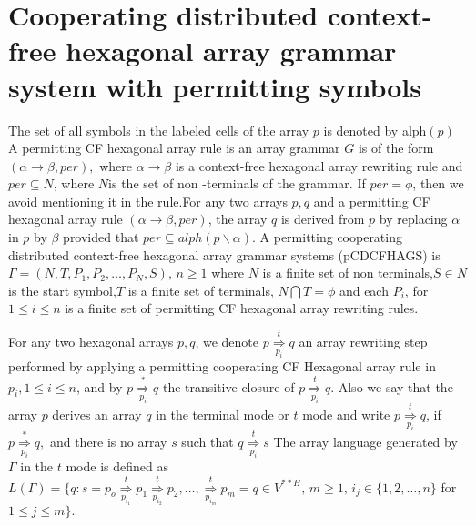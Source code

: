 \documentclass[11pt]{article}
\begin{document}
\section {Cooperating distributed context-free hexagonal array grammar system with permitting symbols}

The set of all symbols in the labeled cells of the array $p$ is denoted by alph$(p)$ A permitting CF hexagonal
 array rule is an array grammar $G$ is of the form $(\alpha\rightarrow\beta,per),$ where $\alpha\rightarrow\beta$
 is a context-free hexagonal array rewriting rule and $per\subseteq N$, where $N$is the set of non -terminals of the grammar.
 If $per=\phi$, then we avoid mentioning it in the rule.For any two arrays $p,q$ and a  permitting CF hexagonal array rule
 $(\alpha\rightarrow\beta,per)$, the array $q$ is derived from $p$ by replacing $\alpha$ in $p$ by $\beta$ provided that
 $per \subseteq alph(p\backslash\alpha)$. A permitting cooperating distributed context-free hexagonal array grammar systems
 (pCDCFHAGS) is $\Gamma=(N,T,P_1, P_2 ,\ldots,P_N,S),\,n\geq 1$ where $N$ is a finite  set of non terminals,$S\in N$ is
 the start symbol,$T$ is a finite set of terminals, $N\bigcap T=\phi$ and each $P_i$, for $1\leq i \leq n $ is a finite set
 of permitting CF hexagonal array rewriting rules.

For any two hexagonal arrays $p,q$, we denote $p\underset{p_i}{\overset{t}{\Rightarrow}}q$
an array rewriting step performed by applying a permitting cooperating CF Hexagonal array rule in $p_i,1\leq i \leq n$,
 and by $p\underset{p_i}{\overset{*}{\Rightarrow}}q$  the transitive closure of $p\underset{p_i}{\overset{t}{\Rightarrow}}q.$
 Also we say that the array $p$ derives an array $q$ in the terminal mode or $t$ mode and write $p\underset{p_i}{\overset{t}{\Rightarrow}}q$, if$p\underset{p_i}{\overset{*}{\Rightarrow}}q,$ and there is no array $s$ such that $q\underset{p_i}{\overset{t}{\Rightarrow}}s$ The array language generated by $\Gamma$ in the $t$ mode is defined as
$L(\Gamma)=\{q\colon s=
p_o\underset{p_{i_1}}{\overset{t}{\Rightarrow}}
p_1\underset{p_{i_2}}{\overset{t}{\Rightarrow}}
p_2,\ldots,\underset{p_{i_m}}{\overset{t}{\Rightarrow}} p_m =q\in
V^{**H},\,m \geq 1,\,i_j\in \{1,2,\ldots,n\}$ for $1\le j\le m\}.$
\end{document}
